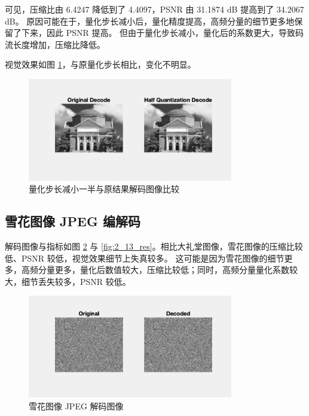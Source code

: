 \documentclass[a4paper]{article}  %
\begin{document}
可见，压缩比由 6.4247 降低到了 4.4097，PSNR 由 31.1874 dB 提高到了 34.2067 dB。
原因可能在于，量化步长减小后，量化精度提高，高频分量的细节更多地保留了下来，因此 PSNR 提高。
但由于量化步长减小，量化后的系数更大，导致码流长度增加，压缩比降低。

视觉效果如图 \ref{fig:2_12_decode}，与原量化步长相比，变化不明显。

\begin{figure}[ht]
    \centering
    \includegraphics[width=0.8\textwidth]{asserts/2_12_decode.png}
    \caption{
        量化步长减小一半与原结果解码图像比较
    }\label{fig:2_12_decode}
\end{figure}

\subsection{雪花图像 JPEG 编解码}

解码图像与指标如图 \ref{fig:2_13_decode} 与 \ref{fig:2_13_res}。相比大礼堂图像，雪花图像的压缩比较低、PSNR 较低，视觉效果细节上失真较多。
这可能是因为雪花图像的细节更多，高频分量更多，量化后数值较大，压缩比较低；同时，高频分量量化系数较大，细节丢失较多，PSNR 较低。

\begin{figure}[ht]
    \centering
    \includegraphics[width=0.8\textwidth]{asserts/2_13_decode.png}
    \caption{
        雪花图像 JPEG 解码图像
    }\label{fig:2_13_decode}
\end{figure}
\end{document}
